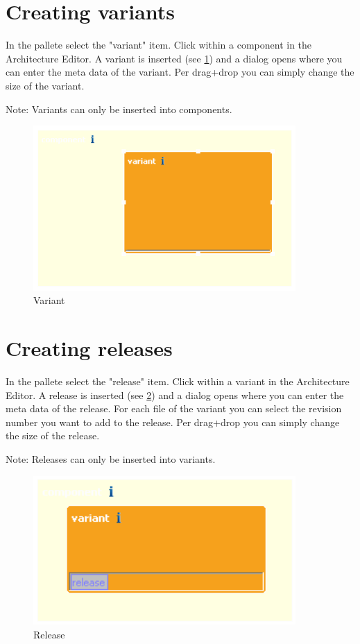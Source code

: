 \section{Creating variants}

In the pallete select the "variant" item. Click within a component in 
the Architecture Editor. A variant is inserted (see \ref{variant}) and a dialog opens where you can enter the meta data of
the variant. Per drag+drop you can simply change the size of the variant. \par
Note: Variants can only be inserted into components.

\begin{figure}[h!]
\begin{center}
\includegraphics[width=10cm]{variant.png}
   \caption{Variant}
\label{variant}
\end{center}
\end{figure}\par


\section{Creating releases}

In the pallete select the "release" item. Click within a variant in 
the Architecture Editor. A release is inserted (see \ref{release}) and a dialog opens where you can enter the meta data of
the release. For each file of the variant you can select the revision number you want to add to the release. 
Per drag+drop you can simply change the size of the release. \par
Note: Releases can only be inserted into variants.

\begin{figure}[h!]
\begin{center}
\includegraphics[width=10cm]{release.png}
   \caption{Release}
\label{release}
\end{center}
\end{figure}\par




